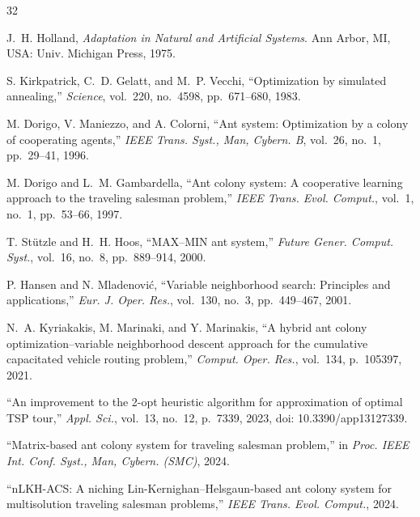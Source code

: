 \documentclass[lettersize,journal]{IEEEtran}
\begin{document}
\begin{thebibliography}{32}

J.~H. Holland, \textit{Adaptation in Natural and Artificial Systems}. Ann Arbor, MI, USA: Univ. Michigan Press, 1975.


S. Kirkpatrick, C.~D. Gelatt, and M.~P. Vecchi, ``Optimization by simulated annealing,'' \textit{Science}, vol.~220, no.~4598, pp.~671--680, 1983.


M. Dorigo, V. Maniezzo, and A. Colorni, ``Ant system: Optimization by a colony of cooperating agents,'' \textit{IEEE Trans. Syst., Man, Cybern. B}, vol.~26, no.~1, pp.~29--41, 1996.


M. Dorigo and L.~M. Gambardella, ``Ant colony system: A cooperative learning approach to the traveling salesman problem,'' \textit{IEEE Trans. Evol. Comput.}, vol.~1, no.~1, pp.~53--66, 1997.


T. St\"utzle and H.~H. Hoos, ``MAX--MIN ant system,'' \textit{Future Gener. Comput. Syst.}, vol.~16, no.~8, pp.~889--914, 2000.


P. Hansen and N. Mladenovi\'c, ``Variable neighborhood search: Principles and applications,'' \textit{Eur. J. Oper. Res.}, vol.~130, no.~3, pp.~449--467, 2001.


N.~A. Kyriakakis, M. Marinaki, and Y. Marinakis, ``A hybrid ant colony optimization--variable neighborhood descent approach for the cumulative capacitated vehicle routing problem,'' \textit{Comput. Oper. Res.}, vol.~134, p.~105397, 2021.


``An improvement to the 2-opt heuristic algorithm for approximation of optimal TSP tour,'' \textit{Appl. Sci.}, vol.~13, no.~12, p.~7339, 2023, doi: 10.3390/app13127339.


``Matrix-based ant colony system for traveling salesman problem,'' in \textit{Proc. IEEE Int. Conf. Syst., Man, Cybern. (SMC)}, 2024.


``nLKH-ACS: A niching Lin-Kernighan--Helsgaun-based ant colony system for multisolution traveling salesman problems,'' \textit{IEEE Trans. Evol. Comput.}, 2024.


\end{thebibliography}
\end{document}
